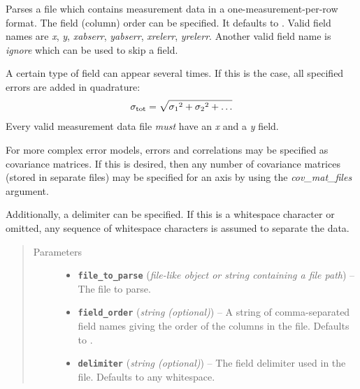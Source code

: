 \documentclass[a4paper,10pt,english]{sphinxmanual}
\begin{document}
\begin{fulllineitems}
\label{index:kafe.file_tools.parse_column_data}
Parses a file which contains measurement data in a one-measurement-per-row
format. The field (column) order can be specified. It defaults to
.
Valid field names are \emph{x}, \emph{y}, \emph{xabserr}, \emph{yabserr}, \emph{xrelerr},
\emph{yrelerr}. Another valid field name is \emph{ignore} which can be used to skip
a field.

A certain type of field can appear several times. If this is the case, all
specified errors are added in quadrature:
\begin{gather}
\begin{split}\sigma_{\text{tot}} = \sqrt{{\sigma_1}^2+{\sigma_2}^2+\dots}\end{split}\notag
\end{gather}
Every valid measurement data file \emph{must} have an \emph{x} and a \emph{y} field.

For more complex error models, errors and correlations may be specified as
covariance matrices. If this is desired, then any number of covariance
matrices (stored in separate files) may be specified for an axis by
using the \emph{cov\_mat\_files} argument.

Additionally, a delimiter can be specified. If this is a whitespace
character or omitted, any sequence of whitespace characters is assumed to
separate the data.
\begin{quote}\begin{description}
\item[{Parameters}] \leavevmode\begin{itemize}
\item {} 
\textbf{\texttt{file\_to\_parse}} (\emph{file-like object or string containing a file path}) -- The file to parse.

\item {} 
\textbf{\texttt{field\_order}} (\emph{string (optional)}) -- A string of comma-separated field names giving the order of the columns
in the file. Defaults to .

\item {} 
\textbf{\texttt{delimiter}} (\emph{string (optional)}) -- The field delimiter used in the file. Defaults to any whitespace.


\end{itemize}
\end{description}
\end{quote}
\end{fulllineitems}
\end{document}
